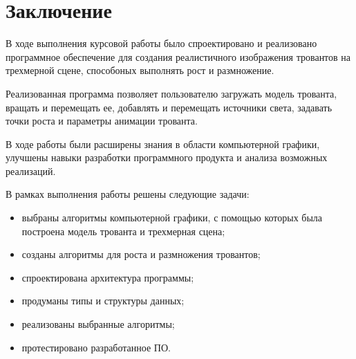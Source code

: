 \chapter*{Заключение}

В ходе выполнения курсовой работы было спроектировано и реализовано программное обеспечение для создания реалистичного изображения тровантов на трехмерной сцене, способоных выполнять рост и размножение. 

Реализованная программа позволяет пользователю загружать модель трованта, вращать и перемещать ее, добавлять и перемещать источники света, задавать точки роста и параметры анимации трованта.

В ходе работы были расширены знания в области компьютерной графики, улучшены навыки разработки программного продукта и анализа возможных реализаций.

В рамках выполнения работы решены следующие задачи:
\begin{itemize}
	\item выбраны алгоритмы компьютерной графики, с помощью которых была построена модель трованта и трехмерная сцена;
	\item созданы алгоритмы для роста и размножения тровантов;
	\item спроектирована архитектура программы;
	\item продуманы типы и структуры данных;
	\item реализованы выбранные алгоритмы;
	\item протестировано разработанное ПО.
\end{itemize}